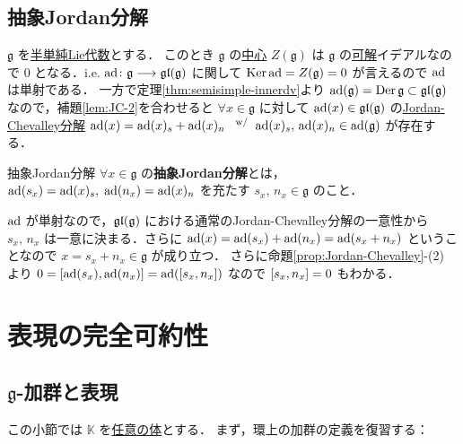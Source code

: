 \documentclass[rep_main]{subfiles}
\begin{document}
\subsection{抽象Jordan分解}

$\mathfrak{g}$ を\hyperref[def:semisimple-LieAlg]{半単純Lie代数}とする．
このとき $\mathfrak{g}$ の\hyperref[def:center-LieAlg]{中心} $Z(\mathfrak{g})$ は $\mathfrak{g}$ の\hyperref[def:solvable-LieAlg]{可解}イデアルなので $0$ となる．i.e. $\operatorname{ad} \colon \mathfrak{g} \longrightarrow \mathfrak{gl} (\mathfrak{g})$ に関して $\operatorname{Ker} \operatorname{ad} = Z(\mathfrak{g}) = 0$ が言えるので $\operatorname{ad}$ は単射である．
一方で定理\ref{thm:semisimple-innerdv}より $\operatorname{ad} (\mathfrak{g}) = \operatorname{Der} \mathfrak{g} \subset \mathfrak{gl} (\mathfrak{g})$ なので，補題\ref{lem:JC-2}を合わせると
$\forall x \in \mathfrak{g}$ に対して $\operatorname{ad}(x) \in \mathfrak{gl}(\mathfrak{g})$ の\hyperref[prop:Jordan-Chevalley]{Jordan-Chevalley分解}
$\operatorname{ad}(x) = \operatorname{ad}(x)_s + \operatorname{ad}(x)_n\;\mathrel{} {}^{\mathrm{w}/} \mathrel{} \operatorname{ad}(x)_s,\, \operatorname{ad}(x)_n \in \operatorname{ad}(\mathfrak{g})$ が存在する．

\begin{mydef}[label=def:abstruct-JC]{抽象Jordan分解}
	$\forall x \in \mathfrak{g}$ の\textbf{抽象Jordan分解}とは，
	$\operatorname{ad}(s_x) = \operatorname{ad}(x)_s,\; \operatorname{ad}(n_x) = \operatorname{ad}(x)_n$ を充たす $s_x,\, n_x \in \mathfrak{g}$ のこと．
\end{mydef}

$\operatorname{ad}$ が単射なので，$\mathfrak{gl}(\mathfrak{g})$ における通常のJordan-Chevalley分解の一意性から $s_x,\, n_x$ は一意に決まる．さらに $\operatorname{ad}(x) = \operatorname{ad}(s_x) + \operatorname{ad}(n_x) = \operatorname{ad}(s_x+n_x)$ ということなので $x = s_x + n_x \in \mathfrak{g}$ が成り立つ．
さらに命題\ref{prop:Jordan-Chevalley}-(2) より $0 = \comm{\ad(s_x)}{\ad(n_x)} = \ad(\comm{s_x}{n_x})$ なので $\comm{s_x}{n_x} = 0$ もわかる．

\section{表現の完全可約性}

\subsection{$\mathfrak{g}$-加群と表現}

この小節では $\mathbb{K}$ を\underline{任意の体}とする．
まず，環上の加群の定義を復習する：
\end{document}
